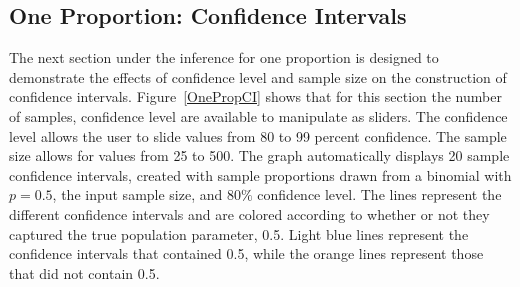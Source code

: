 \documentclass[11pt]{book}
\begin{document}
 

\subsection{One Proportion: Confidence Intervals}
The next section under the inference for one proportion is designed to demonstrate the effects of confidence level and sample size on the construction of confidence intervals. Figure~\ref{OnePropCI} shows that for this section the number of samples, confidence level are available to manipulate as sliders.  The confidence level allows the user to slide values from 80 to 99 percent confidence. The sample size allows for values from 25 to 500.  The graph automatically displays 20 sample confidence intervals, created with sample proportions drawn from a binomial with $p= 0.5$, the input sample size, and $80\%$ confidence level. The lines represent the different confidence intervals and are colored according to whether or not they captured the true population parameter, 0.5.  Light blue lines represent the confidence intervals that contained 0.5, while the orange lines represent those that did not contain 0.5. 
\end{document}
